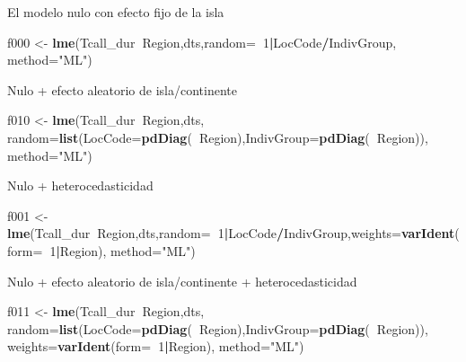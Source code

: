 \documentclass[]{article}
\newenvironment{Shaded}{\begin{snugshade}}{\end{snugshade}}
\newcommand{\DataTypeTok}[1]{\textcolor[rgb]{0.13,0.29,0.53}{#1}}
\newcommand{\DecValTok}[1]{\textcolor[rgb]{0.00,0.00,0.81}{#1}}
\newcommand{\KeywordTok}[1]{\textcolor[rgb]{0.13,0.29,0.53}{\textbf{#1}}}
\newcommand{\NormalTok}[1]{#1}
\newcommand{\OperatorTok}[1]{\textcolor[rgb]{0.81,0.36,0.00}{\textbf{#1}}}
\newcommand{\StringTok}[1]{\textcolor[rgb]{0.31,0.60,0.02}{#1}}
\begin{document}
El modelo nulo con efecto fijo de la isla

\begin{Shaded}
\begin{Highlighting}[]
\NormalTok{f000 <-}\StringTok{ }\KeywordTok{lme}\NormalTok{(Tcall_dur}\OperatorTok{~}\NormalTok{Region,dts,}\DataTypeTok{random=}\OperatorTok{~}\DecValTok{1}\OperatorTok{|}\NormalTok{LocCode}\OperatorTok{/}\NormalTok{IndivGroup, }\DataTypeTok{method=}\StringTok{"ML"}\NormalTok{)}
\end{Highlighting}
\end{Shaded}

Nulo + efecto aleatorio de isla/continente

\begin{Shaded}
\begin{Highlighting}[]
\NormalTok{f010 <-}\StringTok{ }\KeywordTok{lme}\NormalTok{(Tcall_dur}\OperatorTok{~}\NormalTok{Region,dts,}
  \DataTypeTok{random=}\KeywordTok{list}\NormalTok{(}\DataTypeTok{LocCode=}\KeywordTok{pdDiag}\NormalTok{(}\OperatorTok{~}\NormalTok{Region),}\DataTypeTok{IndivGroup=}\KeywordTok{pdDiag}\NormalTok{(}\OperatorTok{~}\NormalTok{Region)), }\DataTypeTok{method=}\StringTok{"ML"}\NormalTok{)}
\end{Highlighting}
\end{Shaded}

Nulo + heterocedasticidad

\begin{Shaded}
\begin{Highlighting}[]
\NormalTok{f001 <-}\StringTok{ }\KeywordTok{lme}\NormalTok{(Tcall_dur}\OperatorTok{~}\NormalTok{Region,dts,}\DataTypeTok{random=}\OperatorTok{~}\DecValTok{1}\OperatorTok{|}\NormalTok{LocCode}\OperatorTok{/}\NormalTok{IndivGroup,}\DataTypeTok{weights=}\KeywordTok{varIdent}\NormalTok{(}\DataTypeTok{form=}\OperatorTok{~}\DecValTok{1}\OperatorTok{|}\NormalTok{Region), }\DataTypeTok{method=}\StringTok{"ML"}\NormalTok{)}
\end{Highlighting}
\end{Shaded}

Nulo + efecto aleatorio de isla/continente + heterocedasticidad

\begin{Shaded}
\begin{Highlighting}[]
\NormalTok{f011 <-}
\StringTok{ }\KeywordTok{lme}\NormalTok{(Tcall_dur}\OperatorTok{~}\NormalTok{Region,dts,}
   \DataTypeTok{random=}\KeywordTok{list}\NormalTok{(}\DataTypeTok{LocCode=}\KeywordTok{pdDiag}\NormalTok{(}\OperatorTok{~}\NormalTok{Region),}\DataTypeTok{IndivGroup=}\KeywordTok{pdDiag}\NormalTok{(}\OperatorTok{~}\NormalTok{Region)),}
   \DataTypeTok{weights=}\KeywordTok{varIdent}\NormalTok{(}\DataTypeTok{form=}\OperatorTok{~}\DecValTok{1}\OperatorTok{|}\NormalTok{Region), }\DataTypeTok{method=}\StringTok{"ML"}\NormalTok{)}
\end{Highlighting}
\end{Shaded}
\end{document}
